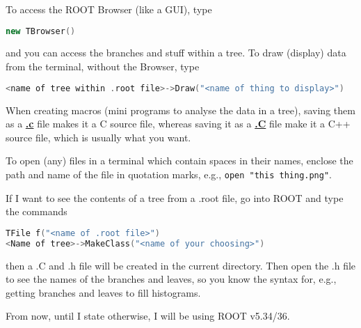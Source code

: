 To access the ROOT Browser (like a GUI), type

\begin{lstlisting}[belowskip=-0.7cm, language=C++, numbers=none]
new TBrowser()
\end{lstlisting}

and you can access the branches and stuff within a tree. To draw (display) data from the terminal, without the Browser, type

\begin{lstlisting}[belowskip=-0.7cm, language=C++, numbers=none]
<name of tree within .root file>->Draw("<name of thing to display>")
\end{lstlisting}

When creating macros (mini programs to analyse the data in a tree), saving them as a \underline{\textbf{.c}} file makes it a C source file, whereas saving it as a \underline{\textbf{.C}} file make it a C++ source file, which is usually what you want.

To open (any) files in a terminal which contain spaces in their names, enclose the path and name of the file in quotation marks, e.g., \texttt{open "this thing.png"}.

If I want to see the contents of a tree from a .root file, go into ROOT and type the commands

\begin{lstlisting}[belowskip=-0.7cm, language=C++, numbers=none]
TFile f("<name of .root file>")
<Name of tree>->MakeClass("<name of your choosing>")
\end{lstlisting}

then a .C and .h file will be created in the current directory. Then open the .h file to see the names of the branches and leaves, so you know the syntax for, e.g., getting branches and leaves to fill histograms.


From now, until I state otherwise, I will be using ROOT v5.34/36.
